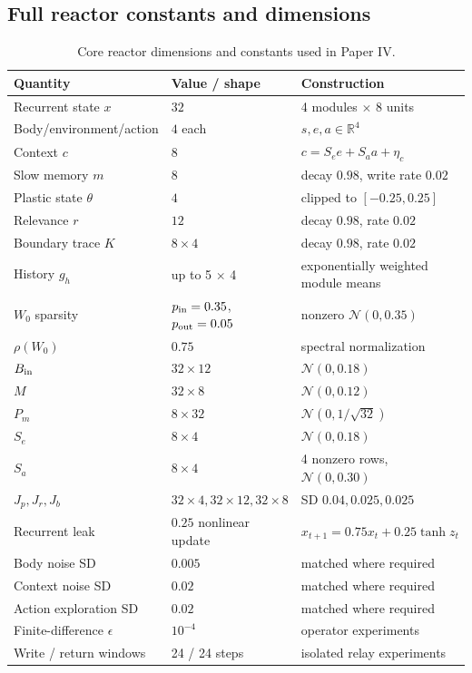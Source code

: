\documentclass[11pt]{article}
\begin{document}
\subsection{Full reactor constants and dimensions}

\begin{table}[H]
\caption{Core reactor dimensions and constants used in Paper IV.}
\begin{tabular}{lll}
Quantity & Value / shape & Construction\\
\hline
Recurrent state $x$ & $32$ & 4 modules $\times$ 8 units\\
Body/environment/action & $4$ each & $s,e,a\in\mathbb{R}^4$\\
Context $c$ & $8$ & $c=S_ee+S_aa+\eta_c$\\
Slow memory $m$ & $8$ & decay $0.98$, write rate $0.02$\\
Plastic state $\theta$ & $4$ & clipped to $[-0.25,0.25]$\\
Relevance $r$ & $12$ & decay $0.98$, rate $0.02$\\
Boundary trace $K$ & $8\times4$ & decay $0.98$, rate $0.02$\\
History $g_h$ & up to 5 $\times$ 4 & exponentially weighted module means\\
$W_0$ sparsity & $p_{\rm in}=0.35$, $p_{\rm out}=0.05$ & nonzero $\mathcal N(0,0.35)$\\
$\rho(W_0)$ & $0.75$ & spectral normalization\\
$B_{\rm in}$ & $32\times12$ & $\mathcal N(0,0.18)$\\
$M$ & $32\times8$ & $\mathcal N(0,0.12)$\\
$P_m$ & $8\times32$ & $\mathcal N(0,1/\sqrt{32})$\\
$S_e$ & $8\times4$ & $\mathcal N(0,0.18)$\\
$S_a$ & $8\times4$ & 4 nonzero rows, $\mathcal N(0,0.30)$\\
$J_p,J_r,J_b$ & $32\times4,32\times12,32\times8$ & SD $0.04,0.025,0.025$\\
Recurrent leak & $0.25$ nonlinear update & $x_{t+1}=0.75x_t+0.25\tanh z_t$\\
Body noise SD & $0.005$ & matched where required\\
Context noise SD & $0.02$ & matched where required\\
Action exploration SD & $0.02$ & matched where required\\
Finite-difference $\epsilon$ & $10^{-4}$ & operator experiments\\
Write / return windows & 24 / 24 steps & isolated relay experiments\\
\end{tabular}
\end{table}
\end{document}
